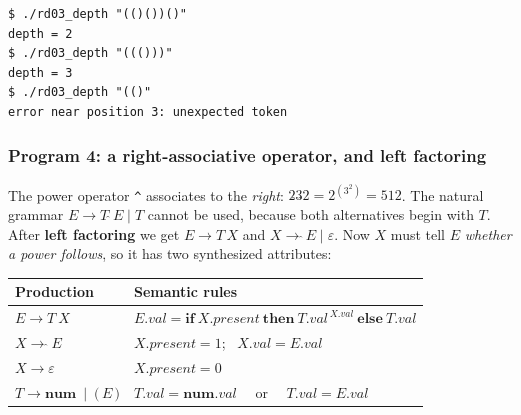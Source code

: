 \documentclass[11pt,a4paper]{article}
\newcommand{\at}[2]{\ensuremath{#1.\mathit{#2}}}
\newcommand{\tok}[1]{\ensuremath{\mathtt{#1}}}
\begin{document}
\begin{lstlisting}[basicstyle=\ttfamily\footnotesize,tabsize=4]
$ ./rd03_depth "(()())()"
depth = 2
$ ./rd03_depth "((()))"
depth = 3
$ ./rd03_depth "(()"
error near position 3: unexpected token
\end{lstlisting}

\subsubsection*{Program 4: a right-associative operator, and left factoring}
The power operator \texttt{\^{}} associates to the \emph{right}: $2\hat{}3\hat{}2=2^{(3^2)}=512$. The natural grammar $E\to T\,\hat{}\,E\mid T$ cannot be used, because both alternatives begin with $T$. After \textbf{left factoring} we get $E\to T\,X$ and $X\to\hat{}\,E\mid\varepsilon$. Now $X$ must tell $E$ \emph{whether a power follows}, so it has two synthesized attributes:
\begin{center}
\small
\begin{tabular}{@{}l l@{}}
\toprule
\textbf{Production} & \textbf{Semantic rules} \\ \midrule
$E \to T\ X$ & $\at{E}{val}=\mathbf{if}\ \at{X}{present}\ \mathbf{then}\ \at{T}{val}^{\,\at{X}{val}}\ \mathbf{else}\ \at{T}{val}$ \\
$X \to \hat{}\ E$ & $\at{X}{present}=1$; \ $\at{X}{val}=\at{E}{val}$ \\
$X \to \varepsilon$ & $\at{X}{present}=0$ \\
$T \to \mathbf{num}\ \mid\ \tok{(}\,E\,\tok{)}$ & $\at{T}{val}=\at{\mathbf{num}}{val}$ \ \ or \ \ $\at{T}{val}=\at{E}{val}$ \\ \bottomrule
\end{tabular}
\end{center}
\end{document}
